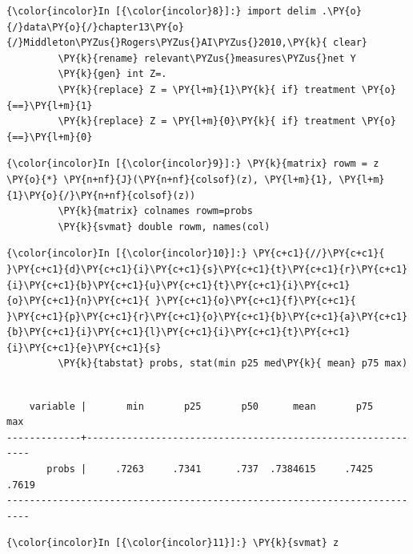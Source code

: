 \documentclass[11pt,notitlepage]{article}\usepackage[]{graphicx}\usepackage[]{color}
\makeatletter
\newenvironment{kframe}{%
 \def\at@end@of@kframe{}%
 \ifinner\ifhmode%
  \def\at@end@of@kframe{\end{minipage}}%
  \begin{minipage}{\columnwidth}%
 \fi\fi%
 \def\FrameCommand##1{\hskip\@totalleftmargin \hskip-\fboxsep
 \colorbox{shadecolor}{##1}\hskip-\fboxsep
     \hskip-\linewidth \hskip-\@totalleftmargin \hskip\columnwidth}%
 \MakeFramed {\advance\hsize-\width
   \@totalleftmargin\z@ \linewidth\hsize
   \@setminipage}}%
 {\par\unskip\endMakeFramed%
 \at@end@of@kframe}
\newenvironment{knitrout}{}{} %
\makeatother
\begin{document}
\begin{enumerate}[a)]
\begin{knitrout}
\begin{kframe}
    \begin{Verbatim}[commandchars=\\\{\}]
{\color{incolor}In [{\color{incolor}8}]:} import delim .\PY{o}{/}data\PY{o}{/}chapter13\PY{o}{/}Middleton\PYZus{}Rogers\PYZus{}AI\PYZus{}2010,\PY{k}{ clear}
         \PY{k}{rename} relevant\PYZus{}measures\PYZus{}net Y
         \PY{k}{gen} int Z=.
         \PY{k}{replace} Z = \PY{l+m}{1}\PY{k}{ if} treatment \PY{o}{==}\PY{l+m}{1}
         \PY{k}{replace} Z = \PY{l+m}{0}\PY{k}{ if} treatment \PY{o}{==}\PY{l+m}{0}
\end{Verbatim}

    \begin{Verbatim}[commandchars=\\\{\}]
{\color{incolor}In [{\color{incolor}9}]:} \PY{k}{matrix} rowm = z \PY{o}{*} \PY{n+nf}{J}(\PY{n+nf}{colsof}(z), \PY{l+m}{1}, \PY{l+m}{1}\PY{o}{/}\PY{n+nf}{colsof}(z))
         \PY{k}{matrix} colnames rowm=probs
         \PY{k}{svmat} double rowm, names(col)
\end{Verbatim}

    \begin{Verbatim}[commandchars=\\\{\}]
{\color{incolor}In [{\color{incolor}10}]:} \PY{c+c1}{//}\PY{c+c1}{ }\PY{c+c1}{d}\PY{c+c1}{i}\PY{c+c1}{s}\PY{c+c1}{t}\PY{c+c1}{r}\PY{c+c1}{i}\PY{c+c1}{b}\PY{c+c1}{u}\PY{c+c1}{t}\PY{c+c1}{i}\PY{c+c1}{o}\PY{c+c1}{n}\PY{c+c1}{ }\PY{c+c1}{o}\PY{c+c1}{f}\PY{c+c1}{ }\PY{c+c1}{p}\PY{c+c1}{r}\PY{c+c1}{o}\PY{c+c1}{b}\PY{c+c1}{a}\PY{c+c1}{b}\PY{c+c1}{i}\PY{c+c1}{l}\PY{c+c1}{i}\PY{c+c1}{t}\PY{c+c1}{i}\PY{c+c1}{e}\PY{c+c1}{s}
         \PY{k}{tabstat} probs, stat(min p25 med\PY{k}{ mean} p75 max)
\end{Verbatim}

    \begin{Verbatim}[commandchars=\\\{\}]

    variable |       min       p25       p50      mean       p75       max
-------------+------------------------------------------------------------
       probs |     .7263     .7341      .737  .7384615     .7425     .7619
--------------------------------------------------------------------------

    \end{Verbatim}

    \begin{Verbatim}[commandchars=\\\{\}]
{\color{incolor}In [{\color{incolor}11}]:} \PY{k}{svmat} z
\end{Verbatim}


\end{kframe}
\end{knitrout}
\end{enumerate}
\end{document}
